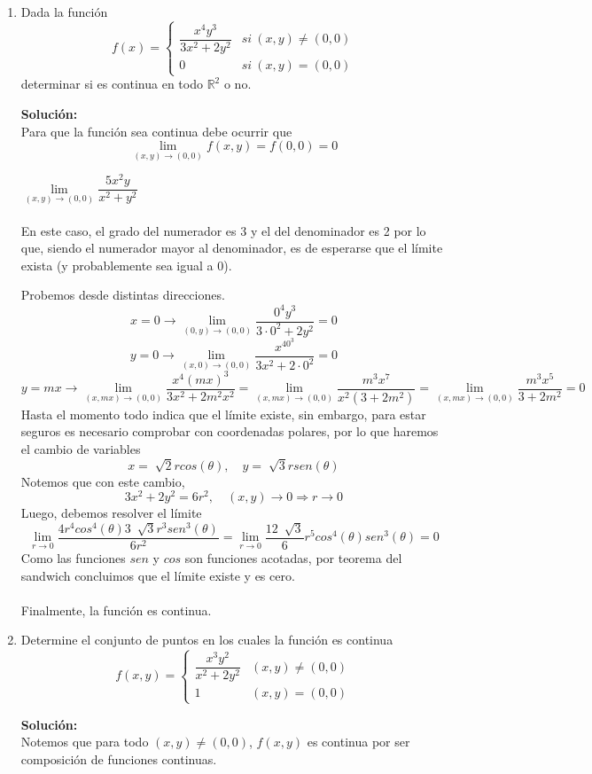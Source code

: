 \documentclass[12pt]{article}
\newenvironment{solucion}
{\begin{mdframed}[backgroundcolor=black!10]
		{\bf Solución:}\\
	}
	{
	\end{mdframed}
}
\newenvironment{preguntas}
{\begin{enumerate}\itemsep12pt
	}
	{
	\end{enumerate}
}
\newcommand{\ra}{\rightarrow}
\newcommand{\R}{\mathbb{R}}
\begin{document}
\begin{preguntas}
\begin{solucion}
\begin{enumerate}[a)]
Como conclusión, para que el límite exista, este debe ser igual para cualquier valor de $\theta$, incluso antes de evaluar el límite.
\end{enumerate}
\end{solucion}
\item Dada la función 
	$$ f(x) = 
	\begin{cases}
	\dfrac{x^4y^3}{3x^2+2y^2} & si\ (x,y) \neq (0,0) \\
	0 & si\ (x,y) = (0,0)
	\end{cases}
	$$
	determinar si es continua en todo $\R^2$ o no.
\begin{solucion}
Para que la función sea continua debe ocurrir que 
$$\lim\limits_{(x,y) \to (0,0)} f(x,y) = f(0,0) = 0$$

$\lim\limits_{(x,y) \to (0,0)} \dfrac{5x^2y}{x^2+y^2}$\\
			\\
			En este caso, el grado del numerador es 3 y el del denominador es 2 por lo que, siendo el numerador mayor al denominador, es de esperarse que el límite exista (y probablemente sea igual a 0).
			
			Probemos desde distintas direcciones.
$$x = 0 \ra \lim\limits_{(0,y) \to (0,0)} \dfrac{0^4y^3}{3\cdot0^2+2y^2} = 0$$
$$y = 0 \ra \lim\limits_{(x,0) \to (0,0)} \dfrac{x^40^3}{3x^2+2\cdot 0^2} = 0$$
$$y = mx \ra \lim\limits_{(x,mx) \to (0,0)} \dfrac{x^4 (mx)^3}{3x^2+2m^2x^2}
= \lim\limits_{(x,mx) \to (0,0)} \dfrac{m^3x^7}{x^2(3+2m^2)}
= \lim\limits_{(x,mx) \to (0,0)} \dfrac{m^3x^5}{3+2m^2} = 0$$
			Hasta el momento todo indica que el límite existe, sin embargo, para estar seguros es necesario comprobar con coordenadas polares, por lo que haremos el cambio de variables
$$x = \sqrt[]{2}rcos(\theta), \quad y = \sqrt[]{3}rsen(\theta)$$
Notemos que con este cambio,
$$3x^2+2y^2 = 6r^2, \quad (x,y)\ra 0 \Longrightarrow r \ra 0$$
Luego, debemos resolver el límite
$$\lim\limits_{r\ra 0} \dfrac{4r^4cos^4(\theta)3\ \sqrt[]{3}r^3sen^3(\theta)}{6r^2}
			= \lim\limits_{r\ra 0} \dfrac{12\ \sqrt[]{3}}{6}r^5cos^4(\theta)sen^3(\theta) = 0$$
			Como las funciones $sen$ y $cos$ son funciones acotadas, por teorema del sandwich concluimos que el límite existe y es cero.\\
\\
Finalmente, la función es continua.
\end{solucion}
\item Determine el conjunto de puntos en los cuales la función es continua
	$$f(x,y) = 
	\begin{cases}
	\dfrac{x^3y^2}{x^2+2y^2} & (x,y) \neq (0,0)\\
	1 & (x,y) = (0,0)
	\end{cases}
	$$
\begin{solucion}
Notemos que para todo $(x,y) \neq (0,0)$, $f(x,y)$ es continua por ser composición de funciones continuas.\\


\end{solucion}
\end{preguntas}
\end{document}
